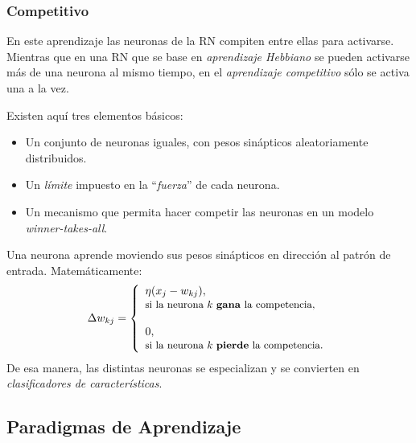 \documentclass[10pt,a4paper]{article}
\begin{document}
\begin{multicols}{2}
\subsubsection{Competitivo}

En este aprendizaje las neuronas de la RN compiten entre ellas para activarse. Mientras que en una RN que se base en \textit{aprendizaje Hebbiano} se pueden activarse más de una neurona al mismo tiempo, en el \textit{aprendizaje competitivo} sólo se activa una a la vez. 

Existen aquí tres elementos básicos:
\begin{itemize}
\item Un conjunto de neuronas iguales, con pesos sinápticos aleatoriamente distribuidos.
\item Un \textit{límite} impuesto en la ``\textit{fuerza}'' de cada neurona.
\item Un mecanismo que permita hacer competir las neuronas en un modelo \textit{winner-takes-all}.
\end{itemize}

Una neurona aprende moviendo sus pesos sinápticos en dirección al patrón de entrada. Matemáticamente:
\[
\Delta w_{kj} = 
 \left\{ 
  \begin{array}{l l}
    \eta(x_j - w_{kj}),
    \\ \text{\small si la neurona $k$ \textbf{gana} la competencia,}
    \vspace{12pt}
    \\
    0, \\
    \text{\small si la neurona $k$ \textbf{pierde} la competencia.}
  \end{array} 
 \right.
\]
De esa manera, las distintas neuronas se especializan y se convierten en \textit{clasificadores de características}.

\end{multicols}

\subsection{Paradigmas de Aprendizaje}
\end{document}

